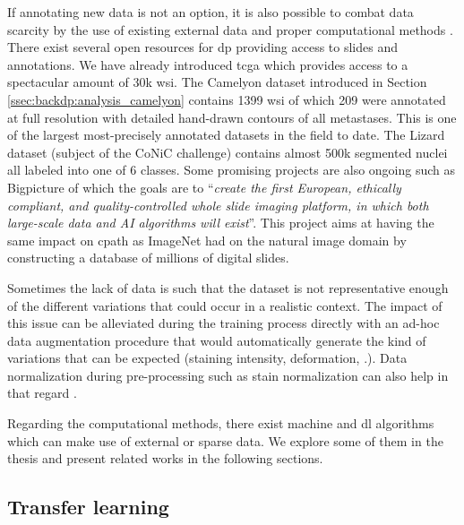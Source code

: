If annotating new data is not an option, it is also possible to combat data scarcity by the use of existing external data and proper computational methods \cite{van2019strategies}. There exist several open resources for \acrlong{dp} \cite{maree2019open} providing access to slides and annotations. We have already introduced \acrshort{tcga} which provides access to a spectacular amount of 30k \acrshort{wsi}. The Camelyon dataset introduced in Section \ref{ssec:backdp:analysis_camelyon} contains 1399 \acrshort{wsi} of which 209 were annotated at full resolution with detailed hand-drawn contours of all metastases. This is one of the largest most-precisely annotated datasets in the field to date. The Lizard dataset (subject of the CoNiC challenge) contains almost 500k segmented nuclei all labeled into one of 6 classes. Some promising projects are also ongoing such as Bigpicture \cite{moulin2021imi} of which the goals are to ``\textit{create the first European, ethically compliant, and quality-controlled whole slide imaging platform, in which both large-scale data and AI algorithms will exist}''. This project aims at having the same impact on \acrlong{cpath} as ImageNet had on the natural image domain by constructing a database of millions of digital slides.

Sometimes the lack of data is such that the dataset is not representative enough of the different variations that could occur in a realistic context. The impact of this issue can be alleviated during the training process directly with an ad-hoc data augmentation procedure that would automatically generate the kind of variations that can be expected (\eg staining intensity, deformation, \etc.). Data normalization during pre-processing such as stain normalization can also help in that regard \cite{kang2021stainnet, runz2021normalization}.

Regarding the computational methods, there exist machine and \acrlong{dl} algorithms which can make use of external or sparse data. We explore some of them in the thesis and present related works in the following sections. 

\subsection{Transfer learning}
\label{ssec:backdp:tl}

